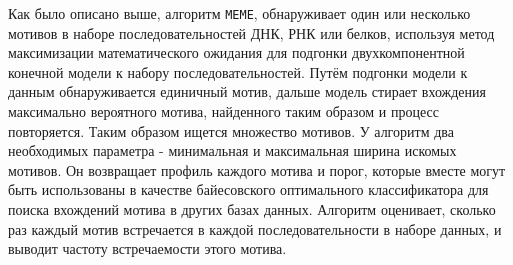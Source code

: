 \documentclass[14pt]{extarticle}
\begin{document}
    \par{Как было описано выше, алгоритм \texttt{MEME}, обнаруживает один или несколько мотивов в наборе 
    последовательностей ДНК, РНК или белков, используя метод максимизации математического ожидания для подгонки 
    двухкомпонентной конечной модели к набору последовательностей. Путём подгонки модели к данным обнаруживается 
    единичный мотив, дальше модель стирает вхождения максимально вероятного мотива, найденного таким образом и процесс 
    повторяется. Таким образом ищется множество мотивов. У алгоритм два необходимых параметра - минимальная и 
    максимальная ширина искомых мотивов. Он возвращает профиль каждого мотива и порог, которые вместе могут быть 
    использованы в качестве байесовского оптимального классификатора для поиска вхождений мотива в других базах данных. 
    Алгоритм оценивает, сколько раз каждый мотив встречается в каждой последовательности в наборе данных, и выводит 
    частоту встречаемости этого мотива. \cite{meme}}
    
\end{document}
